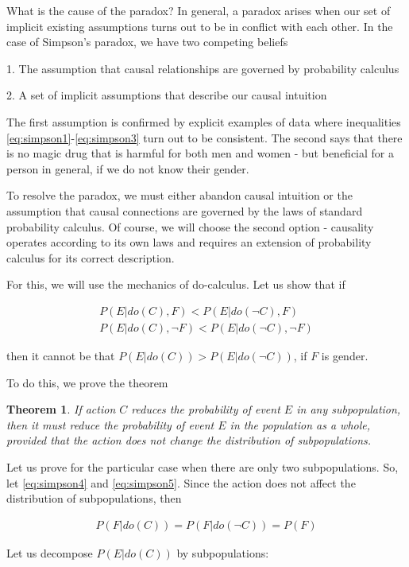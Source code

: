 \documentclass[fleqn]{article}
\newtheorem{theorem}{Theorem}
\numberwithin{equation}{section}
\numberwithin{theorem}{section}
\numberwithin{figure}{section}
\numberwithin{lemma}{section}
\numberwithin{corollary}{section}
\begin{document}
What is the cause of the paradox? In general, a paradox arises when our set of implicit existing assumptions turns out to be in conflict with each other. In the case of Simpson's paradox, we have two competing beliefs

1. The assumption that causal relationships are governed by probability calculus

2. A set of implicit assumptions that describe our causal intuition

The first assumption is confirmed by explicit examples of data where inequalities \ref{eq:simpson1}-\ref{eq:simpson3} turn out to be consistent. The second says that there is no magic drug that is harmful for both men and women - but beneficial for a person in general, if we do not know their gender.

To resolve the paradox, we must either abandon causal intuition or the assumption that causal connections are governed by the laws of standard probability calculus. Of course, we will choose the second option - causality operates according to its own laws and requires an extension of probability calculus for its correct description.

For this, we will use the mechanics of do-calculus. Let us show that if 

\begin{align}
	P(E| do(C), F) < P(E|do(\neg C), F) \label{eq:simpson4}\\
	P(E| do(C), \neg F) < P(E|do(\neg C), \neg F)\label{eq:simpson5}
\end{align} 

then it cannot be that $P(E| do(C)) > P(E| do(\neg C))$, if $F$ is gender.

To do this, we prove the theorem 
\begin{theorem}
	If action $C$ reduces the probability of event $E$ in any subpopulation, then it must reduce the probability of event $E$ in the population as a whole, provided that the action does not change the distribution of subpopulations.
\end{theorem}

Let us prove for the particular case when there are only two subpopulations. So, let \ref{eq:simpson4} and \ref{eq:simpson5}. Since the action does not affect the distribution of subpopulations, then 

\begin{align}
	P(F|do(C)) = P(F|do(\neg C)) = P(F)
\end{align}

Let us decompose $P(E|do(C))$ by subpopulations:
\end{document}
